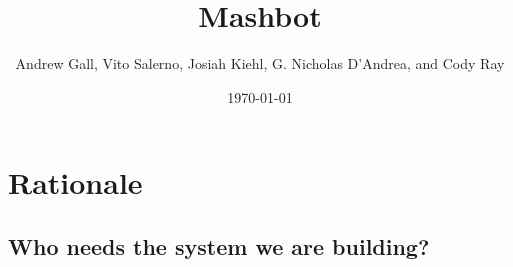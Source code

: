 \documentclass{beamer}
\begin{document}
	\title{Mashbot}
	\author{Andrew Gall, Vito Salerno, Josiah Kiehl, G. Nicholas D'Andrea, and Cody Ray}
	\date{\today}

	\frame{\titlepage}
	

	\section{Rationale}
		\subsection{Who needs the system we are building?}
		
\end{document}
